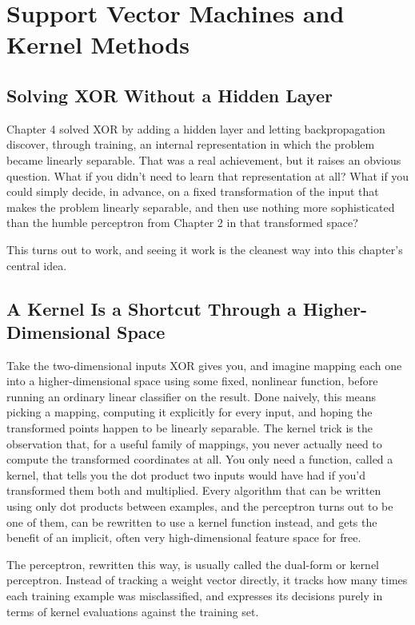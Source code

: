 \chapter{Support Vector Machines and Kernel Methods}

\section*{Solving XOR Without a Hidden Layer}

Chapter 4 solved XOR by adding a hidden layer and letting backpropagation discover, through training, an internal representation in which the problem became linearly separable. That was a real achievement, but it raises an obvious question. What if you didn't need to learn that representation at all? What if you could simply decide, in advance, on a fixed transformation of the input that makes the problem linearly separable, and then use nothing more sophisticated than the humble perceptron from Chapter 2 in that transformed space?

This turns out to work, and seeing it work is the cleanest way into this chapter's central idea.

\section*{A Kernel Is a Shortcut Through a Higher-Dimensional Space}

Take the two-dimensional inputs XOR gives you, and imagine mapping each one into a higher-dimensional space using some fixed, nonlinear function, before running an ordinary linear classifier on the result. Done naively, this means picking a mapping, computing it explicitly for every input, and hoping the transformed points happen to be linearly separable. The kernel trick is the observation that, for a useful family of mappings, you never actually need to compute the transformed coordinates at all. You only need a function, called a kernel, that tells you the dot product two inputs would have had if you'd transformed them both and multiplied. Every algorithm that can be written using only dot products between examples, and the perceptron turns out to be one of them, can be rewritten to use a kernel function instead, and gets the benefit of an implicit, often very high-dimensional feature space for free.

The perceptron, rewritten this way, is usually called the dual-form or kernel perceptron. Instead of tracking a weight vector directly, it tracks how many times each training example was misclassified, and expresses its decisions purely in terms of kernel evaluations against the training set.

